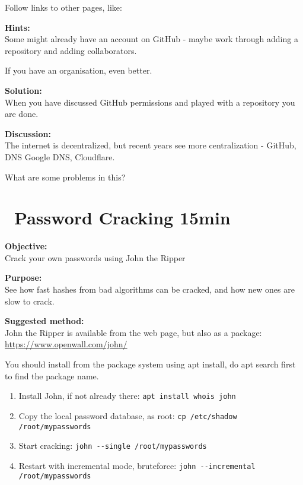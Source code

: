 \documentclass[a4paper,11pt,notitlepage]{report}
\begin{document}
Follow links to other pages, like:\\


{\bf Hints:}\\
Some might already have an account on GitHub - maybe work through adding a repository and adding collaborators.

If you have an organisation, even better.

{\bf Solution:}\\
When you have discussed GitHub permissions and played with a repository you are done.

{\bf Discussion:}\\
The internet is decentralized, but recent years see more centralization - GitHub, DNS Google DNS, Cloudflare.

What are some problems in this?




\chapter{\faExclamationTriangle\ Password Cracking 15min}
\label{ex:pwcrack-101}

{\bf Objective:}\\
Crack your own passwords using John the Ripper


{\bf Purpose:}\\
See how fast hashes from bad algorithms can be cracked, and how new ones are slow to crack.

{\bf Suggested method:}\\
John the Ripper is available from the web page, but also as a package:\\
\url{https://www.openwall.com/john/}

You should install from the package system using apt install, do apt search first to find the package name.

\begin{enumerate}
\item Install John, if not already there: \verb+apt install whois john+
\item Copy the local password database, as root: \verb+cp /etc/shadow /root/mypasswords+
\item Start cracking: \verb+john --single /root/mypasswords+
\item Restart with incremental mode, bruteforce: \verb+john --incremental /root/mypasswords+
\end{enumerate}
\end{document}

